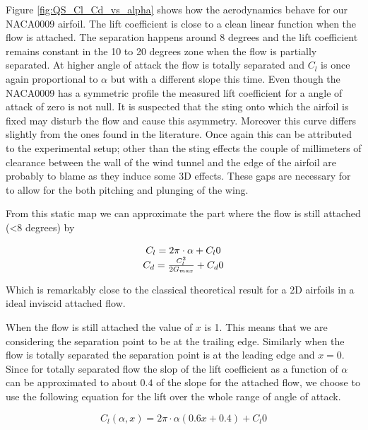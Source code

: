 \par Figure \ref{fig:QS_Cl_Cd_vs_alpha} shows how the aerodynamics behave for our NACA0009 airfoil.
The lift coefficient is close to a clean linear function when the flow is attached.
The separation happens around 8 degrees and the lift coefficient remains constant in the 10 to 20 degrees zone when the flow is partially separated.
At higher angle of attack the flow is totally separated and $C_l$ is once again proportional to $\alpha$ but with a different slope this time.
Even though the NACA0009 has a symmetric profile the measured lift coefficient for a angle of attack of zero is not null.
It is suspected that the sting onto which the airfoil is fixed may disturb the flow and cause this asymmetry.
Moreover this curve differs slightly from the ones found in the literature.
Once again this can be attributed to the experimental setup; other than the sting effects the couple of millimeters of clearance between the wall of the wind tunnel and the edge of the airfoil are probably to blame as they induce some 3D effects.
These gaps are necessary for to allow for the both pitching and plunging of the wing.



\par From this static map we can approximate the part where the flow is still attached (<8 degrees) by 

\begin{equation}
	\begin{array}[c]{c}
		C_l= 2 \pi \cdot \alpha + C_l0 \\
		C_d= \frac{C_l^2}{2G_{max}} + C_d0
	\end{array}
	\label{eqn:attached_Cl_and_Cd_vs_alpha}
\end{equation}

Which is remarkably close to the classical theoretical result for a 2D airfoils in a ideal inviscid attached flow.

When the flow is still attached the value of $x$ is 1. 
This means that we are considering the separation point to be at the trailing edge.
Similarly when the flow is totally separated the separation point is at the leading edge and $x=0$.
Since for totally separated flow the slop of the lift coefficient as a function of $\alpha$ can be approximated to about $0.4$ of the slope for the attached flow, we choose to use the following equation for the lift over the whole range of angle of attack. 


\begin{equation}
	C_l(\alpha,x)=2 \pi \cdot \alpha (0.6 x + 0.4) + C_l0
	\label{eqn:Cl_function}
\end{equation}

